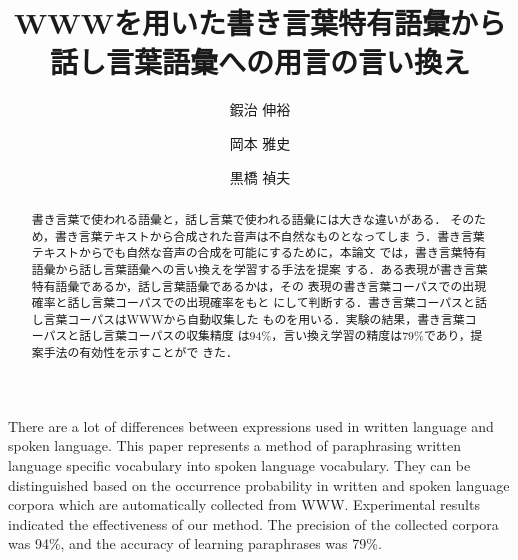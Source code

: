 \documentclass{nlp}
\begin{document}
\setcounter{page}{19}
\setcounter{Volume}{11}
\setcounter{Number}{9}
\setcounter{Year}{2004} 
\setcounter{Month}{10}


\def\tr#1#2{}
\def\trr#1#2{}

\setcounter{exnum}{1}
\renewcommand{\labelenumi}{}
\renewcommand{\labelenumii}{}


\title{WWWを用いた書き言葉特有語彙から話し言葉語彙への用言の言い換え}
\author{鍜治 伸裕 \and 岡本 雅史 \and 黒橋 禎夫}




\begin{abstract}
 書き言葉で使われる語彙と，話し言葉で使われる語彙には大きな違いがある．
 そのため，書き言葉テキストから合成された音声は不自然なものとなってしま
 う．書き言葉テキストからでも自然な音声の合成を可能にするために，本論文
 では，書き言葉特有語彙から話し言葉語彙への言い換えを学習する手法を提案
 する．ある表現が書き言葉特有語彙であるか，話し言葉語彙であるかは，その
 表現の書き言葉コーパスでの出現確率と話し言葉コーパスでの出現確率をもと
 にして判断する．書き言葉コーパスと話し言葉コーパスはWWWから自動収集した
 ものを用いる．実験の結果，書き言葉コーパスと話し言葉コーパスの収集精度
 は94\%，言い換え学習の精度は79\%であり，提案手法の有効性を示すことがで
 きた．
 \end{abstract}




\begin{eabstract}
  There are a lot of differences between expressions used in written
 language and spoken language. This paper represents a method of
 paraphrasing written language specific vocabulary into spoken language
 vocabulary. They can be distinguished based on the occurrence
 probability in written and spoken language corpora which are
 automatically collected from WWW. Experimental results indicated the
 effectiveness of our method. The precision of the collected corpora was
 94\%, and the accuracy of learning paraphrases was 79\%.
\end{eabstract}
\end{document}
